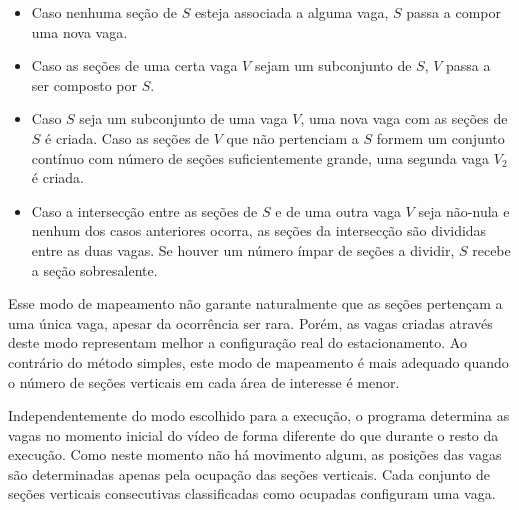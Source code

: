 \begin{itemize}
	\item Caso nenhuma seção de $S$ esteja associada a alguma vaga, $S$ passa a compor uma nova vaga.
	\item Caso as seções de uma certa vaga $V$ sejam um subconjunto de $S$, $V$ passa a ser composto por $S$.
	\item Caso $S$ seja um subconjunto de uma vaga $V$, uma nova vaga com as seções de $S$ é criada. Caso as seções de $V$ que não pertenciam a $S$ formem um conjunto contínuo com número de seções suficientemente grande, uma segunda vaga $V_2$ é criada.
	\item Caso a intersecção entre as seções de $S$ e de uma outra vaga $V$ seja não-nula e nenhum dos casos anteriores ocorra, as seções da intersecção são divididas entre as duas vagas. Se houver um número ímpar de seções a dividir, $S$ recebe a seção sobresalente.
\end{itemize}

Esse modo de mapeamento não garante naturalmente que as seções pertençam a uma única vaga, apesar da ocorrência ser rara. Porém, as vagas criadas através deste modo representam melhor a configuração real do estacionamento. Ao contrário do método simples, este modo de mapeamento é mais adequado quando o número de seções verticais em cada área de interesse é menor.

Independentemente do modo escolhido para a execução, o programa determina as vagas no momento inicial do vídeo de forma diferente do que durante o resto da execução. Como neste momento não há movimento algum, as posições das vagas são determinadas apenas pela ocupação das seções verticais. Cada conjunto de seções verticais consecutivas classificadas como ocupadas configuram uma vaga.








